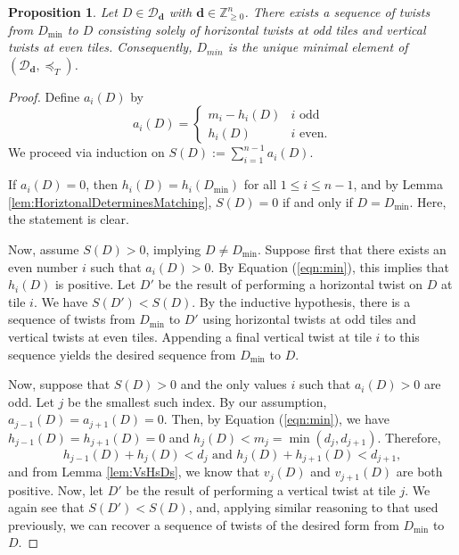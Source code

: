 \documentclass{amsart}
\newtheorem{proposition}[theorem]{Proposition}
\theoremstyle{definition}
\begin{document}
 \begin{proposition}\label{prop:uniquemin}
Let $D \in \mathcal{D}_{\mathbf{d}}$ with $\mathbf{d}\in\mathbb{Z}^n_{\ge 0}$. There exists a sequence of twists from $D_{\min}$ to $D$ consisting solely of horizontal twists at odd tiles and vertical twists at even tiles. Consequently, $D_{min}$ is the unique minimal element of $(\mathcal{D}_{\mathbf{d}},\preceq_T)$.
 \end{proposition}

\begin{proof}
Define $a_i(D)$ by \begin{equation}\label{eqn:min}
a_i(D) = \begin{cases}
m_i - h_i(D) & i \text{ odd}\\
h_i(D) & i \text{ even.}
\end{cases}
\end{equation}
We proceed via induction on $S(D) := \sum_{i=1}^{n-1}a_i(D)$. 

If $a_i(D) = 0$, then $h_i(D) = h_i(D_{\min})$ for all $1 \leq i \leq n-1$, and   by Lemma \ref{lem:HoriztonalDeterminesMatching}, $S(D) = 0$ if and only if $D = D_{\min}$. Here, the statement is clear.

Now, assume $S(D)>0$, implying $D \neq D_{\min}$. Suppose first that there exists an even number $i$ such that $a_i(D) > 0$. By Equation (\ref{eqn:min}), this implies that $h_i(D)$ is positive. Let $D'$ be the result of performing a horizontal twist on $D$ at tile $i$. We have $S(D') < S(D)$. By the inductive hypothesis, there is a sequence of twists from $D_{\min}$ to $D'$ using horizontal twists at odd tiles and vertical twists at even tiles. Appending a final vertical twist at tile $i$ to this sequence yields the desired sequence from $D_{\min}$ to $D$. 

Now, suppose that $S(D)>0$ and the only values $i$ such that $a_i(D) > 0$ are odd.  Let $j$ be the smallest such index. By our assumption, $a_{j-1}(D) = a_{j+1}(D) = 0$. Then, by Equation (\ref{eqn:min}), we have $h_{j-1}(D) = h_{j+1}(D) = 0$ and $h_j(D) < m_j = \min(d_j,d_{j+1})$. Therefore, \[
h_{j-1}(D) + h_j(D) < d_j \text{ and } h_j(D) + h_{j+1}(D) < d_{j+1},
\]
and from Lemma \ref{lem:VsHsDs}, we know that $v_j(D)$ and $v_{j+1}(D)$ are both positive. Now, let $D'$ be the result of performing a vertical twist at tile $j$. We again see that $S(D') < S(D)$, and, applying similar reasoning to that used previously, we can recover a sequence of twists of the desired form from $D_{\min}$ to $D$. 
\end{proof}
\end{document}
